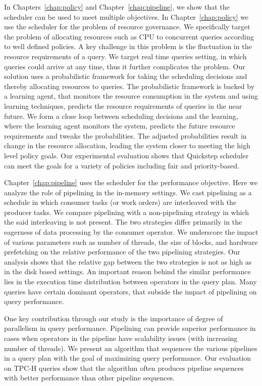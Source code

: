 In Chapters~\ref{chap:policy} and Chapter~\ref{chap:pipeline}, we show that the scheduler can be used to meet multiple objectives.
In Chapter~\ref{chap:policy} we use the scheduler for the problem of resource governance.
We specifically target the problem of allocating resources such as CPU to concurrent queries according to well defined policies.
A key challenge in this problem is the fluctuation in the resource requirements of a query.
We target real time queries setting, in which queries could arrive at any time, thus it further complicates the problem.
Our solution uses a probabilistic framework for taking the scheduling decisions and thereby allocating resources to queries.
The probabilistic framework is backed by a learning agent, that monitors the resource consumption in the system and using learning techniques, predicts the resource requirements of queries in the near future.  
We form a close loop between scheduling decisions and the learning, where the learning agent monitors the system, predicts the future resource requirements and tweaks the probabilities. 
The adjusted probabilities result in change in the resource allocation, leading the system closer to meeting the high level policy goals.
Our experimental evaluation shows that Quickstep scheduler can meet the goals for a variety of policies including fair and priority-based. 

Chapter~\ref{chap:pipeline} uses the scheduler for the performance objective.
Here we analyze the role of pipelining in the in-memory settings. 
We cast pipelining as a schedule in which consumer tasks (or work orders) are interleaved with the producer tasks. 
We compare pipelining with a non-pipelining strategy in which the said interleaving is not present. 
The two strategies differ primarily in the eagerness of data processing by the consumer operator. 
We underscore the impact of various parameters such as number of threads, the size of blocks, and hardware prefetching on the relative performance of the two pipelining strategies. 
Our analysis shows that the relative gap between the two strategies is not as high as in the disk based settings. 
An important reason behind the similar performance lies in the execution time distribution between operators
in the query plan.
Many queries have certain dominant operators, that subside the impact of pipelining on query performance.

One key contribution through our study is the importance of degree of parallelism in query performance. 
Pipelining can provide superior performance in cases when operators in the pipeline have scalability issues (with increasing number of threads). 
We present an algorithm that sequences the various pipelines in a query plan with the goal of maximizing query performance.  
Our evaluation on TPC-H queries show that the algorithm often produces pipeline sequences with better performance than other pipeline sequences. 

